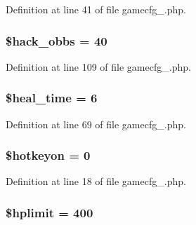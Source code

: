 Definition at line 41 of file gamecfg\+\_.\+php.

\hypertarget{gamecfg__1_8php_ace20ccf761c1d090f4a6db31168b0883}{
\subsubsection[{\$hack\+\_\+obbs}]{\setlength{\rightskip}{0pt plus 5cm}\$hack\+\_\+obbs = 40}}\label{gamecfg__1_8php_ace20ccf761c1d090f4a6db31168b0883}


Definition at line 109 of file gamecfg\+\_.\+php.

\hypertarget{gamecfg__1_8php_aa4695f36473eeaf50163ea29fdc918ab}{
\subsubsection[{\$heal\+\_\+time}]{\setlength{\rightskip}{0pt plus 5cm}\$heal\+\_\+time = 6}}\label{gamecfg__1_8php_aa4695f36473eeaf50163ea29fdc918ab}


Definition at line 69 of file gamecfg\+\_.\+php.

\hypertarget{gamecfg__1_8php_a0e0ee5defa1b1d539fefe3204af96d1f}{
\subsubsection[{\$hotkeyon}]{\setlength{\rightskip}{0pt plus 5cm}\$hotkeyon = 0}}\label{gamecfg__1_8php_a0e0ee5defa1b1d539fefe3204af96d1f}


Definition at line 18 of file gamecfg\+\_.\+php.

\hypertarget{gamecfg__1_8php_a70b943cda29c3eafca420a4ad2a8db5b}{
\subsubsection[{\$hplimit}]{\setlength{\rightskip}{0pt plus 5cm}\$hplimit = 400}}\label{gamecfg__1_8php_a70b943cda29c3eafca420a4ad2a8db5b}


